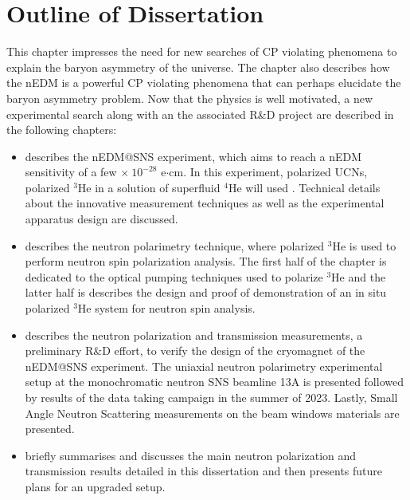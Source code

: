 
\section{Outline of Dissertation}

This chapter impresses the need for new searches of CP violating phenomena to explain the baryon asymmetry of the universe. The chapter also describes how the nEDM is a powerful CP violating phenomena that can perhaps elucidate the baryon asymmetry problem. Now that the physics is well motivated, a new experimental search along with an the associated R\&D project are described in the following chapters:
\begin{itemize}
    \item {} describes the nEDM@SNS experiment, which aims to reach a nEDM sensitivity of a few $\times~10^{-28}$ e$\cdot$cm. In this experiment, polarized UCNs, polarized $^3$He in a solution of superfluid $^4$He will used \cite{Ahmed2019}. Technical details about the innovative measurement techniques as well as the experimental apparatus design are discussed.
    \item {} describes the neutron polarimetry technique, where polarized $^3$He is used to perform neutron spin polarization analysis. The first half of the chapter is dedicated to the optical pumping techniques used to polarize $^3$He and the latter half is describes the design and proof of demonstration of an in situ polarized $^3$He system for neutron spin analysis.   
    \item {} describes the neutron polarization and transmission measurements, a preliminary R\&D effort, to verify the design of the cryomagnet of the nEDM@SNS experiment. The uniaxial neutron polarimetry experimental setup at the monochromatic neutron SNS beamline 13A is presented followed by results of the data taking campaign in the summer of 2023. Lastly, Small Angle Neutron Scattering measurements on the beam windows materials are presented.   
    \item {} briefly summarises and discusses the main neutron polarization and transmission results detailed in this dissertation and then presents future plans for an upgraded setup.
\end{itemize}